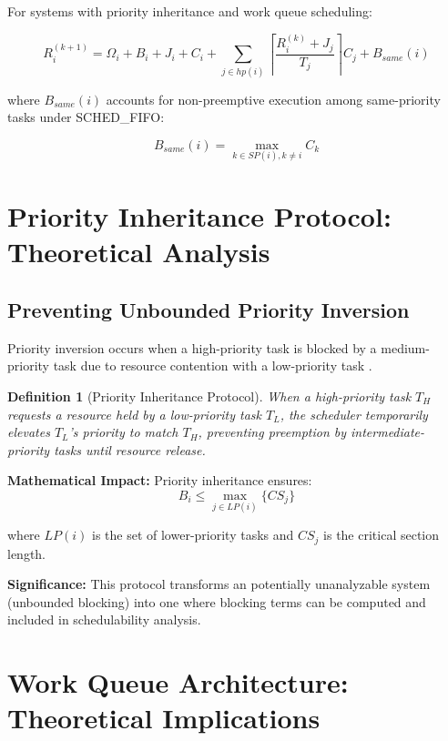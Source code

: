 \documentclass[12pt,a4paper]{article}
\newtheorem{definition}{Definition}
\begin{document}
For systems with priority inheritance and work queue scheduling:

\begin{equation}
R_i^{(k+1)} = \Omega_i + B_i + J_i + C_i + \sum_{j \in hp(i)} \left\lceil \frac{R_i^{(k)} + J_j}{T_j} \right\rceil C_j + B_{same}(i)
\end{equation}

where $B_{same}(i)$ accounts for non-preemptive execution among same-priority tasks under SCHED\_FIFO:

\begin{equation}
B_{same}(i) = \max_{k \in SP(i), k \neq i} C_k
\end{equation}

\section{Priority Inheritance Protocol: Theoretical Analysis}

\subsection{Preventing Unbounded Priority Inversion}

Priority inversion occurs when a high-priority task is blocked by a medium-priority task due to resource contention with a low-priority task \cite{sha1990}.

\begin{definition}[Priority Inheritance Protocol]
When a high-priority task $T_H$ requests a resource held by a low-priority task $T_L$, the scheduler temporarily elevates $T_L$'s priority to match $T_H$, preventing preemption by intermediate-priority tasks until resource release.
\end{definition}

\textbf{Mathematical Impact:} Priority inheritance ensures:
\begin{equation}
B_i \leq \max_{j \in LP(i)} \{CS_j\}
\end{equation}

where $LP(i)$ is the set of lower-priority tasks and $CS_j$ is the critical section length.

\textbf{Significance:} This protocol transforms an potentially unanalyzable system (unbounded blocking) into one where blocking terms can be computed and included in schedulability analysis.

\section{Work Queue Architecture: Theoretical Implications}
\end{document}
